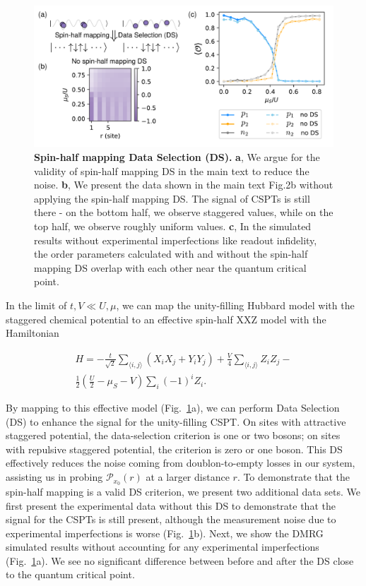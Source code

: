 \documentclass[preprint,superscriptaddress,floatfix, nofootinbib]{revtex4-2}
\begin{document}
\begin{figure}
    \centering
    \includegraphics[width=\textwidth]{figures/DS.pdf}
    \caption{\textbf{Spin-half mapping Data Selection (DS).} \textbf{a}, We argue for the validity of spin-half mapping DS in the main text to reduce the noise. \textbf{b}, We present the data shown in the main text Fig.2b without applying the spin-half mapping DS. The signal of CSPTs is still there - on the bottom half, we observe staggered values, while on the top half, we observe roughly uniform values. \textbf{c}, In the simulated results without experimental imperfections like readout infidelity, the order parameters calculated with and without the spin-half mapping DS overlap with each other near the quantum critical point.
    }
    \label{fig: spin_half_DS_extended_data}
\end{figure}

In the limit of $t, V\ll U, \mu$, we can map the unity-filling Hubbard model with the staggered chemical potential to an effective spin-half XXZ model with the Hamiltonian

\begin{equation}
\label{eq: XXZ_Hamiltonian}
\begin{split}
H=-\frac{t}{\sqrt{2}}\sum_{\langle i,j \rangle}(X_iX_j+Y_iY_j)+\frac{V}{4}\sum_{\langle i,j \rangle}Z_iZ_j-\\\frac{1}{2}(\frac{U}{2}-\mu_S-V)\sum_i(-1)^iZ_i.
\end{split}
\end{equation}

By mapping to this effective model (Fig.~\ref{fig: spin_half_DS_extended_data}a), we can perform Data Selection (DS) to enhance the signal for the unity-filling CSPT. On sites with attractive staggered potential, the data-selection criterion is one or two bosons; on sites with repulsive staggered potential, the criterion is zero or one boson. This DS effectively reduces the noise coming from doublon-to-empty losses in our system, assisting us in probing $\mathcal{P}_{x_0}(r)$ at a larger distance $r$. To demonstrate that the spin-half mapping is a valid DS criterion, we present two additional data sets. We first present the experimental data without this DS to demonstrate that the signal for the CSPTs is still present, although the measurement noise due to experimental imperfections is worse (Fig.~\ref{fig: spin_half_DS_extended_data}b). Next, we show the DMRG simulated results without accounting for any experimental imperfections (Fig.~\ref{fig: spin_half_DS_extended_data}a). We see no significant difference between before and after the DS close to the quantum critical point.
\end{document}
